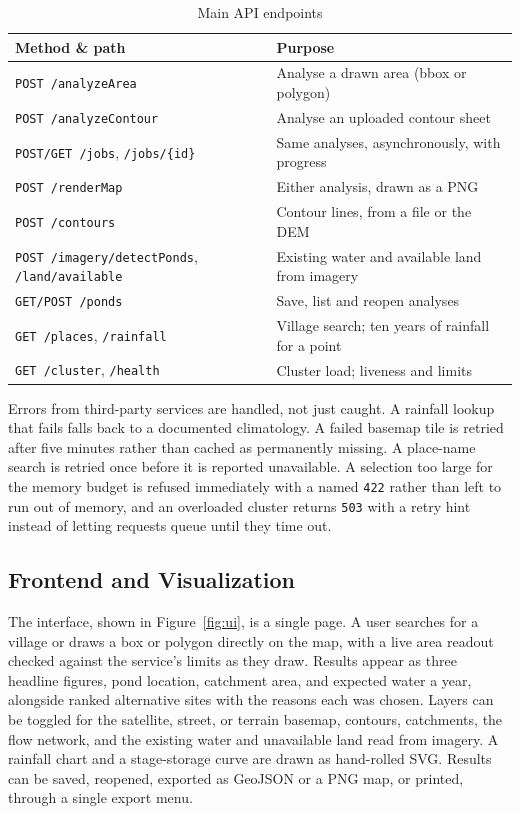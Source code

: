\documentclass[manuscript,screen,review]{acmart}
\begin{document}
\begin{table}[h]
  \caption{Main API endpoints}
  \label{tab:api}
  \begin{tabular}{p{3.6cm}p{3.6cm}}
    \toprule
    Method \& path & Purpose \\
    \midrule
    \texttt{POST /analyzeArea} & Analyse a drawn area (bbox or polygon) \\
    \texttt{POST /analyzeContour} & Analyse an uploaded contour sheet \\
    \texttt{POST/GET /jobs}, \texttt{/jobs/\{id\}} & Same analyses, asynchronously, with progress \\
    \texttt{POST /renderMap} & Either analysis, drawn as a PNG \\
    \texttt{POST /contours} & Contour lines, from a file or the DEM \\
    \texttt{POST /imagery/detectPonds}, \texttt{/land/available} & Existing water and available land from imagery \\
    \texttt{GET/POST /ponds} & Save, list and reopen analyses \\
    \texttt{GET /places}, \texttt{/rainfall} & Village search; ten years of rainfall for a point \\
    \texttt{GET /cluster}, \texttt{/health} & Cluster load; liveness and limits \\
    \bottomrule
  \end{tabular}
\end{table}

Errors from third-party services are handled, not just caught. A rainfall lookup that
fails falls back to a documented climatology. A failed basemap tile is retried after
five minutes rather than cached as permanently missing. A place-name search is retried
once before it is reported unavailable. A selection too large for the memory budget is
refused immediately with a named \texttt{422} rather than left to run out of memory,
and an overloaded cluster returns \texttt{503} with a retry hint instead of letting
requests queue until they time out.

\subsection{Frontend and Visualization}
The interface, shown in Figure~\ref{fig:ui}, is a single page. A user searches for a
village or draws a box or polygon directly on the map, with a live area readout checked
against the service's limits as they draw. Results appear as three headline figures,
pond location, catchment area, and expected water a year, alongside ranked alternative
sites with the reasons each was chosen. Layers can be toggled for the satellite,
street, or terrain basemap, contours, catchments, the flow network, and the existing
water and unavailable land read from imagery. A rainfall chart and a stage-storage
curve are drawn as hand-rolled SVG. Results can be saved, reopened, exported as GeoJSON
or a PNG map, or printed, through a single export menu.
\end{document}

